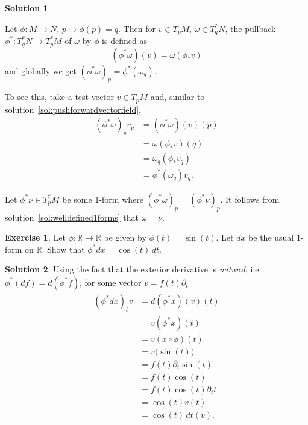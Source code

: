 \documentclass[11pt, a4paper]{report}
\theoremstyle{definition}
\newtheorem{ex}{Exercise}[part]
\newtheorem{sol}{Solution}[part]
\newenvironment{nowidthtags}{\usetagform{nowidth}}{\ignorespacesafterend}
\begin{document}
\begin{sol}\label{sol:pullback1form}

Let $\phi: M \to N$, $p \mapsto \phi(p) = q$. Then for $v \in T_p M$, $\omega \in T_q^* N$, the pullback $\phi^*: T_q^* N \to T_p^* M$ of $\omega$ by $\phi$ is defined as
\begin{nowidthtags}
\[
    (\phi^* \omega)(v) = \omega(\phi_* v) \tag{pullback of a 1-form}\label{eq:pullback1form}
\]
\end{nowidthtags}
and globally we get ${(\phi^* \omega)}_p = \phi^*(\omega_q)$.

To see this, take a test vector $v \in T_p M$ and, similar to solution~\ref{sol:pushforwardvectorfield},
\begin{align*}
    {(\phi^* \omega)}_p v_p &= (\phi^* \omega) (v) (p) \\
        &= \omega(\phi_* v)(q) \\
        &= \omega_q (\phi_* v_q) \\
        &= \phi^* (\omega_q) v_q.
\end{align*}

Let $\phi^*\nu \in T_p^* M$ be some 1-form where ${(\phi^*\omega)}_p = {(\phi^*\nu)}_p$. It follows from solution~\ref{sol:welldefined1forms} that $\omega = \nu$.

\end{sol}

\begin{ex}

Let $\phi: \mathbb{R} \to \mathbb{R}$ be given by $\phi(t) = \sin(t)$. Let $dx$ be the usual 1-form on $\mathbb{R}$. Show that $\phi^*dx = \cos(t) \, dt$.

\end{ex}

\begin{sol}

Using the fact that the exterior derivative is \emph{natural}, i.e. $\phi^*(df) = d(\phi^*f)$, for some vector $v = f(t)\partial_t$
\begin{align*}
    {(\phi^* dx)}_t v &= d(\phi^* x) (v)(t) \\
        &= v(\phi^* x) (t) \\
        &= v(x \circ \phi)(t) \\
        &= v \bigl( \sin(t) \bigr) \\
        &= f(t) \partial_t \sin(t) \\
        &= f(t) \cos(t) \\
        &= f(t) \cos(t) \partial_t t \\
        &= \cos(t) v(t) \\
        &= \cos(t) \, dt(v).
\end{align*}

\end{sol}
\end{document}
